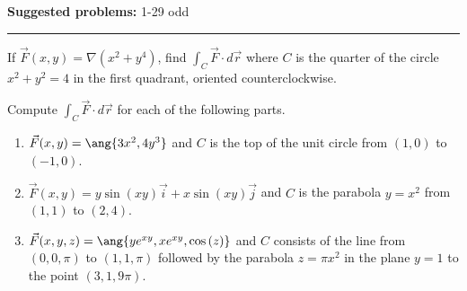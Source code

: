 \documentclass[12pt,reqno]{amsart}
\begin{document}
\textbf{Suggested problems:} 1-29 odd

\bigskip
\hrule

\bigskip
\prob If $\vec{F}(x,y) = \nabla (x^2+y^4)$, find $\int_C \vec{F} \cdot d\vec{r}$ where $C$ is the quarter of the circle $x^2+y^2=4$ in the first quadrant, oriented counterclockwise.

\vfill
\prob Compute $\int_C \vec{F} \cdot d \vec{r}$ for each of the following parts.

\bigskip
\begin{enumerate}
\item $\vec{F}(x,y) = \ang{3x^2,4y^3}$ and $C$ is the top of the unit circle from $(1,0)$ to $(-1,0)$.\vfill\newpage
\item $\vec{F}(x,y) = y\sin{(xy)}\vec{i} + x\sin{(xy)}\vec{j}$ and $C$ is the parabola $y=x^2$ from $(1,1)$ to $(2,4)$.\vfill
\item $\vec{F}(x,y,z) = \ang{ye^{xy},x e^{xy}, \cos{(z)}}$ and $C$ consists of the line from $(0,0,\pi)$ to $(1,1,\pi)$ followed by the parabola $z=\pi x^2$ in the plane $y=1$ to the point $(3,1,9\pi)$.\vfill
\end{enumerate}
\end{document}
